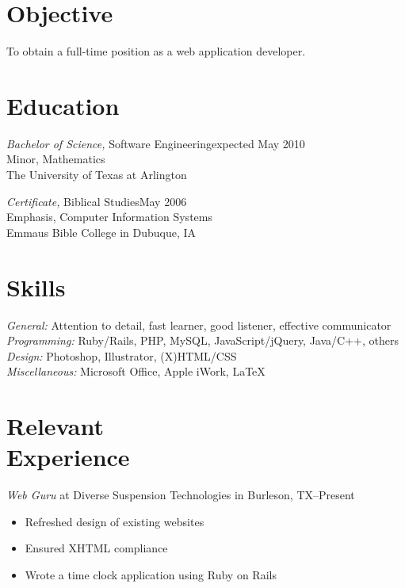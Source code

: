 \documentclass[margin]{res}
\begin{document}
\begin{resume}
 
\section{\textsf{Objective}} 

                To obtain a full-time position as a web application developer.


\section{\textsf{Education}} 

                {\sl Bachelor of Science,} Software Engineering\dotfill expected May 2010\\
                Minor, Mathematics\\
                The University of Texas at Arlington
                
                {\sl Certificate,} Biblical Studies\dotfill May 2006 \\
                Emphasis, Computer Information Systems\\
                Emmaus Bible College in Dubuque, IA


\section{\textsf{Skills}}

                {\sl General:} Attention to detail, fast learner, good listener, effective communicator  \\
                {\sl Programming:} Ruby/Rails, PHP, MySQL, JavaScript/jQuery, Java/C++, others \\
                {\sl Design:} Photoshop, Illustrator, (X)HTML/CSS \\
                {\sl Miscellaneous:} Microsoft Office, Apple iWork, \LaTeX


\section{\textsf{Relevant \\ Experience}} 
                
                {\sl Web Guru}
                 at Diverse Suspension Technologies in Burleson, TX--Present
                 \begin{itemize} \itemsep -2pt %
                   \item Refreshed design of existing websites
                   \item Ensured XHTML compliance
                   \item Wrote a time clock application using Ruby on Rails
                \end{itemize}
                

\end{resume}
\end{document}

